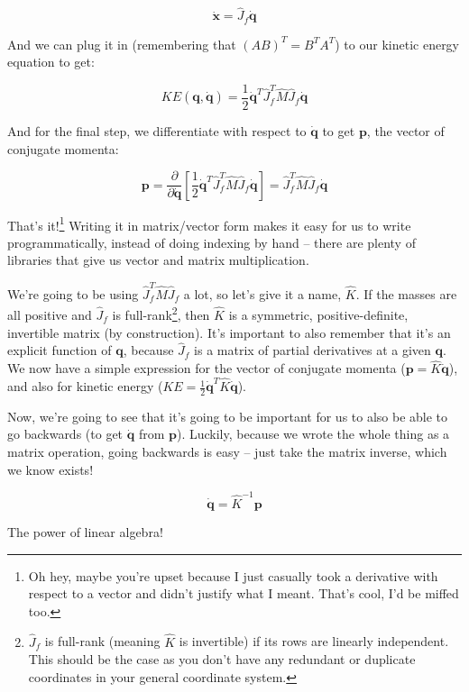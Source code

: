 \documentclass[]{article}
\begin{document}
\[
\dot{\mathbf{x}} = \hat{J}_f \dot{\mathbf{q}}
\]

And we can plug it in (remembering that \((A B)^T = B^T A^T\)) to our kinetic
energy equation to get:

\[
KE(\mathbf{q},\dot{\mathbf{q}}) = \frac{1}{2} \dot{\mathbf{q}}^T \hat{J}_f^T
    \hat{M} \hat{J}_f \dot{\mathbf{q}}
\]

And for the final step, we differentiate with respect to \(\dot{\mathbf{q}}\) to
get \(\mathbf{p}\), the vector of conjugate momenta:

\[
\mathbf{p} = \frac{\partial}{\partial \dot{\mathbf{q}}} \left[
    \frac{1}{2} \dot{\mathbf{q}}^T \hat{J}_f^T \hat{M} \hat{J}_f \dot{\mathbf{q}}
  \right]
  = \hat{J}_f^T \hat{M} \hat{J}_f \dot{\mathbf{q}}
\]

That's it!\footnote{Oh hey, maybe you're upset because I just casually took a
  derivative with respect to a vector and didn't justify what I meant. That's
  cool, I'd be miffed too.} Writing it in matrix/vector form makes it easy for
us to write programmatically, instead of doing indexing by hand -- there are
plenty of libraries that give us vector and matrix multiplication.

We're going to be using \(\hat{J}_f^T \hat{M} \hat{J}_f\) a lot, so let's give
it a name, \(\hat{K}\). If the masses are all positive and \(\hat{J}_f\) is
full-rank\footnote{\(\hat{J}_f\) is full-rank (meaning \(\hat{K}\) is
  invertible) if its rows are linearly independent. This should be the case as
  you don't have any redundant or duplicate coordinates in your general
  coordinate system.}, then \(\hat{K}\) is a symmetric, positive-definite,
invertible matrix (by construction). It's important to also remember that it's
an explicit function of \(\mathbf{q}\), because \(\hat{J}_f\) is a matrix of
partial derivatives at a given \(\mathbf{q}\). We now have a simple expression
for the vector of conjugate momenta (\(\mathbf{p} = \hat{K} \dot{\mathbf{q}}\)),
and also for kinetic energy
(\(KE = \frac{1}{2} \dot{\mathbf{q}}^T \hat{K} \dot{\mathbf{q}}\)).

Now, we're going to see that it's going to be important for us to also be able
to go backwards (to get \(\dot{\mathbf{q}}\) from \(\mathbf{p}\)). Luckily,
because we wrote the whole thing as a matrix operation, going backwards is easy
-- just take the matrix inverse, which we know exists!

\[
\dot{\mathbf{q}} = \hat{K}^{-1} \mathbf{p}
\]

The power of linear algebra!
\end{document}
